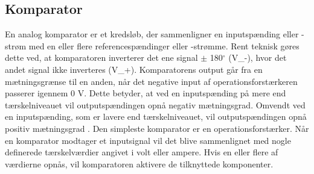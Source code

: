 \subsection{Komparator}\label{Komparatorafsnit}
En analog komparator er et kredsløb, der sammenligner en inputspænding eller -strøm med en eller flere referencespændinger eller -strømme. Rent teknisk gøres dette ved, at komparatoren inverterer det ene signal $\pm$ 180$^{\circ}$ (V_{-}), hvor det andet signal ikke inverteres (V_{+}).
Komparatorens output går fra en mætningsgrænse til en anden, når det negative input af operationsforstærkeren passerer igennem 0 V. Dette betyder, at ved en inputspænding på mere end tærskelniveauet vil outputspændingen opnå negativ mætningsgrad. Omvendt ved en inputspænding, som er lavere end tærskelniveauet, vil outputspændingen opnå positiv mætningsgrad . Den simpleste komparator er en operationsforstærker. \cite{webster2009} 
Når en komparator modtager et inputsignal vil det blive sammenlignet med nogle definerede tærskelværdier angivet i volt eller ampere. Hvis en eller flere af værdierne opnås, vil komparatoren aktivere de tilknyttede komponenter. \\
